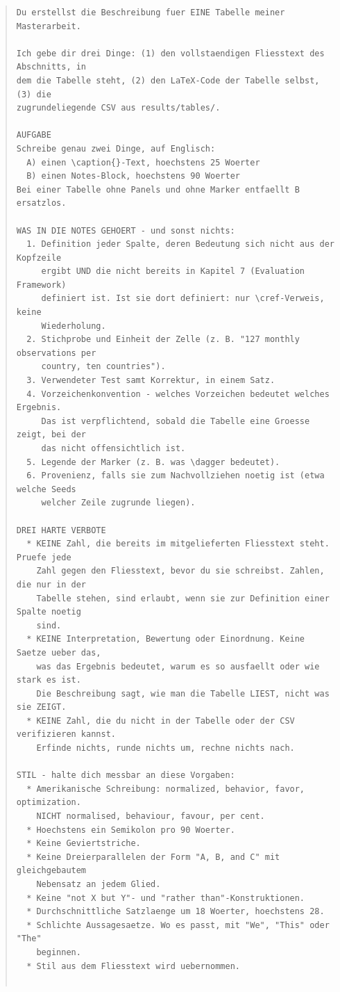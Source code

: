 \begin{quote}\small
\begin{verbatim}
Du erstellst die Beschreibung fuer EINE Tabelle meiner Masterarbeit.

Ich gebe dir drei Dinge: (1) den vollstaendigen Fliesstext des Abschnitts, in
dem die Tabelle steht, (2) den LaTeX-Code der Tabelle selbst, (3) die
zugrundeliegende CSV aus results/tables/.

AUFGABE
Schreibe genau zwei Dinge, auf Englisch:
  A) einen \caption{}-Text, hoechstens 25 Woerter
  B) einen Notes-Block, hoechstens 90 Woerter
Bei einer Tabelle ohne Panels und ohne Marker entfaellt B ersatzlos.

WAS IN DIE NOTES GEHOERT - und sonst nichts:
  1. Definition jeder Spalte, deren Bedeutung sich nicht aus der Kopfzeile
     ergibt UND die nicht bereits in Kapitel 7 (Evaluation Framework)
     definiert ist. Ist sie dort definiert: nur \cref-Verweis, keine
     Wiederholung.
  2. Stichprobe und Einheit der Zelle (z. B. "127 monthly observations per
     country, ten countries").
  3. Verwendeter Test samt Korrektur, in einem Satz.
  4. Vorzeichenkonvention - welches Vorzeichen bedeutet welches Ergebnis.
     Das ist verpflichtend, sobald die Tabelle eine Groesse zeigt, bei der
     das nicht offensichtlich ist.
  5. Legende der Marker (z. B. was \dagger bedeutet).
  6. Provenienz, falls sie zum Nachvollziehen noetig ist (etwa welche Seeds
     welcher Zeile zugrunde liegen).

DREI HARTE VERBOTE
  * KEINE Zahl, die bereits im mitgelieferten Fliesstext steht. Pruefe jede
    Zahl gegen den Fliesstext, bevor du sie schreibst. Zahlen, die nur in der
    Tabelle stehen, sind erlaubt, wenn sie zur Definition einer Spalte noetig
    sind.
  * KEINE Interpretation, Bewertung oder Einordnung. Keine Saetze ueber das,
    was das Ergebnis bedeutet, warum es so ausfaellt oder wie stark es ist.
    Die Beschreibung sagt, wie man die Tabelle LIEST, nicht was sie ZEIGT.
  * KEINE Zahl, die du nicht in der Tabelle oder der CSV verifizieren kannst.
    Erfinde nichts, runde nichts um, rechne nichts nach.

STIL - halte dich messbar an diese Vorgaben:
  * Amerikanische Schreibung: normalized, behavior, favor, optimization.
    NICHT normalised, behaviour, favour, per cent.
  * Hoechstens ein Semikolon pro 90 Woerter.
  * Keine Geviertstriche.
  * Keine Dreierparallelen der Form "A, B, and C" mit gleichgebautem
    Nebensatz an jedem Glied.
  * Keine "not X but Y"- und "rather than"-Konstruktionen.
  * Durchschnittliche Satzlaenge um 18 Woerter, hoechstens 28.
  * Schlichte Aussagesaetze. Wo es passt, mit "We", "This" oder "The"
    beginnen.
  * Stil aus dem Fliesstext wird uebernommen.


\end{verbatim}
\end{quote}
